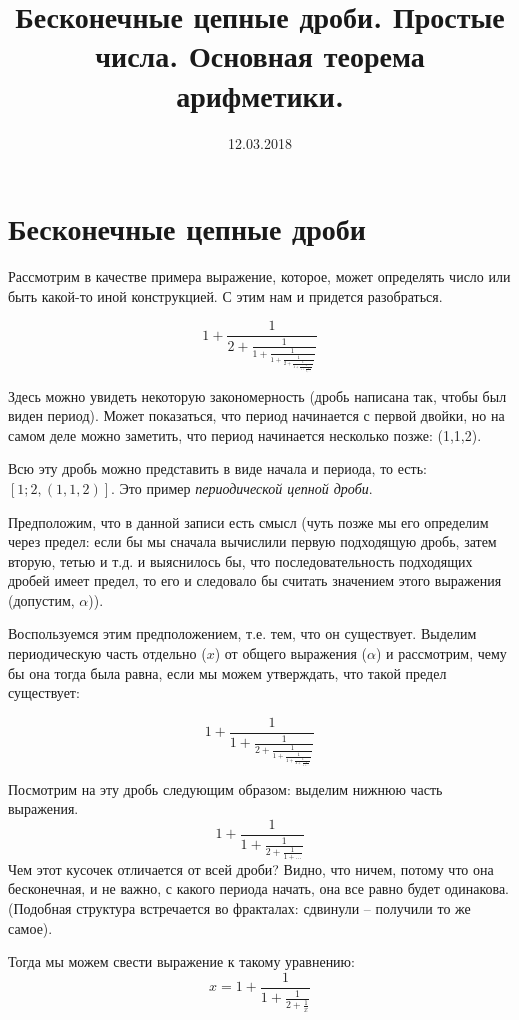 \documentclass[russian]{lecture-notes}
\title{Бесконечные цепные дроби. Простые числа. Основная теорема арифметики.}
\date{12.03.2018}
\begin{document}
	
	\maketitle
	\section*{Бесконечные цепные дроби}
	
	Рассмотрим в качестве примера выражение, которое, может определять число или быть какой-то иной конструкцией. С этим нам и придется разобраться.
	\begin{example*}
		$$1+\frac{1}{2+\frac{1}{1+\frac{1}{1+\frac{1}{2+\frac{1}{1+\frac{1}{1+\frac{1}{2+...}}}}}}}$$
		
		Здесь можно увидеть некоторую закономерность (дробь написана так, чтобы был виден период). Может показаться, что период начинается с первой двойки, но на самом деле можно заметить, что период начинается несколько позже: (1,1,2).
		
		Всю эту дробь можно представить в виде начала и периода, то есть: $[1;2,(1,1,2)]$. Это пример \textit{периодической цепной дроби}.
		
		Предположим, что в данной записи есть смысл (чуть позже мы его определим через предел: если бы мы сначала вычислили первую подходящую дробь, затем вторую, тетью и т.д. и выяснилось бы, что последовательность подходящих дробей имеет предел, то его и следовало бы считать значением этого выражения (допустим, $\alpha$)).
		
		Воспользуемся этим предположением, т.е. тем, что он существует. Выделим периодическую часть отдельно ($x$) от общего выражения ($\alpha$) и рассмотрим, чему бы она тогда была равна, если мы можем утверждать, что такой предел существует:
		
		$$1+\frac{1}{1+\frac{1}{2+\frac{1}{1+\frac{1}{1+\frac{1}{2+\frac{1}{1+...}}}}}}$$
		
		Посмотрим на эту дробь следующим образом: выделим нижнюю часть выражения.$$1+\frac{1}{1+\frac{1}{2+\frac{1}{1+...}}}$$ 
		Чем этот кусочек отличается от всей дроби? Видно, что ничем, потому что она бесконечная, и не важно, с какого периода начать, она все равно будет одинакова. (Подобная структура встречается во фракталах: сдвинули -- получили то же самое).
		
		Тогда мы можем свести выражение к такому уравнению: $$x = 1+\frac{1}{1+\frac{1}{2+\frac{1}{x}}}$$
		

\end{example*}
\end{document}
